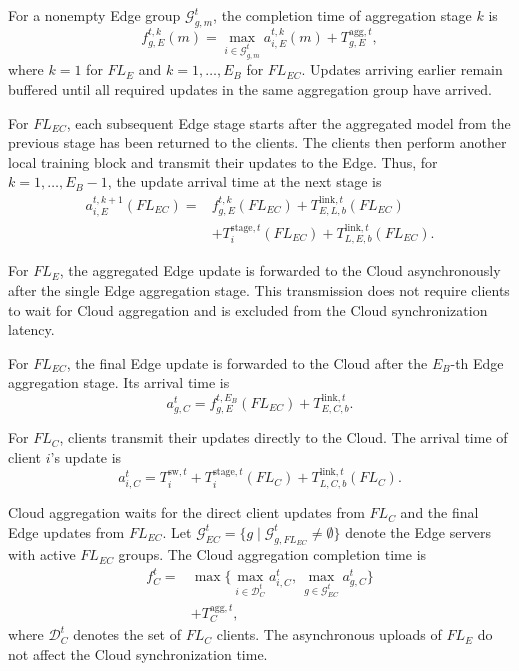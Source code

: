 \documentclass[5p,times]{elsarticle}
\theoremstyle{plain}
\theoremstyle{definition}
\theoremstyle{remark}
\begin{document}
	For a nonempty Edge group
	$\mathcal G_{g,m}^t$, the completion time
	of aggregation stage $k$ is
	\begin{equation}
		f_{g,E}^{t,k}(m)
		=
		\max_{i\in\mathcal G_{g,m}^t}
		a_{i,E}^{t,k}(m)
		+
		T_{g,E}^{\mathrm{agg},t},
		\label{eq:edge_agg_finish}
	\end{equation}
	where $k=1$ for $FL_E$ and
	$k=1,\ldots,E_B$ for $FL_{EC}$.
	Updates arriving earlier remain buffered
	until all required updates in the same
	aggregation group have arrived.
	
	For \(FL_{EC}\), each subsequent Edge stage
	starts after the aggregated model from the
	previous stage has been returned to the
	clients. The clients then perform another
	local training block and transmit their
	updates to the Edge. Thus, for
	\(k=1,\ldots,E_B-1\), the update arrival
	time at the next stage is
	\begin{equation}
		\begin{aligned}
			a_{i,E}^{t,k+1}(FL_{EC})
			={}&f_{g,E}^{t,k}(FL_{EC})
			+T_{E,L,b}^{\mathrm{link},t}(FL_{EC})\\
			&+T_i^{\mathrm{stage},t}(FL_{EC})
			+T_{L,E,b}^{\mathrm{link},t}(FL_{EC}).
		\end{aligned}
	\end{equation}
	
	For \(FL_E\), the aggregated Edge update is
	forwarded to the Cloud asynchronously after
	the single Edge aggregation stage. This
	transmission does not require clients to wait
	for Cloud aggregation and is excluded from
	the Cloud synchronization latency.
	
	For \(FL_{EC}\), the final Edge update is
	forwarded to the Cloud after the \(E_B\)-th
	Edge aggregation stage. Its arrival time is
	\begin{equation}
		a_{g,C}^t
		=
		f_{g,E}^{t,E_B}(FL_{EC})
		+
		T_{E,C,b}^{\mathrm{link},t}.
	\end{equation}
	
	For \(FL_C\), clients transmit their updates
	directly to the Cloud. The arrival time of
	client \(i\)'s update is
	\begin{equation}
		a_{i,C}^t
		=
		T_i^{\mathrm{sw},t}
		+
		T_i^{\mathrm{stage},t}(FL_C)
		+
		T_{L,C,b}^{\mathrm{link},t}(FL_C).
	\end{equation}
	
	Cloud aggregation waits for the direct client
	updates from $FL_C$ and the final Edge updates
	from $FL_{EC}$. 
	Let $\mathcal G_{EC}^t
	=\{g\mid\mathcal G_{g,FL_{EC}}^t
	\neq\emptyset\}$ denote the Edge servers
	with active $FL_{EC}$ groups. The Cloud aggregation
	completion time is
	\begin{equation}
		\begin{aligned}
			f_C^t
			={}&
			\max\Bigg\{
			\max_{i\in\mathcal D_C^t} a_{i,C}^t,\,
			\max_{g\in\mathcal G_{EC}^t} a_{g,C}^t
			\Bigg\}\\
			&+T_C^{\mathrm{agg},t},
			\label{eq:cloud_agg_finish}
		\end{aligned}
	\end{equation}
	where $\mathcal D_C^t$ denotes the set of
	$FL_C$ clients. The asynchronous uploads
	of $FL_E$ do not affect the Cloud
	synchronization time.
	
\end{document}
